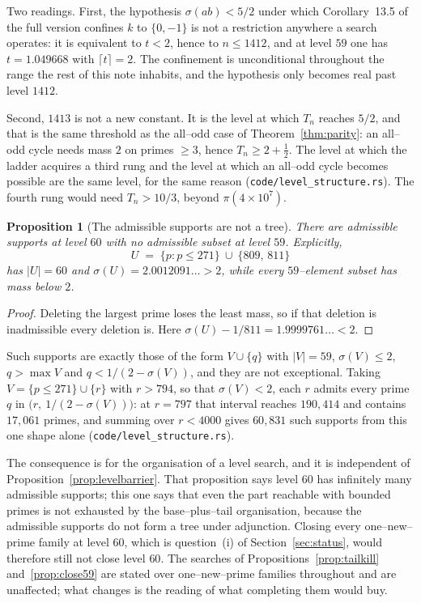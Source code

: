 \documentclass[11pt]{article}
\newtheorem{proposition}[theorem]{Proposition}
\theoremstyle{definition}
\begin{document}
Two readings. First, the hypothesis $\sigma(ab)<5/2$ under which
Corollary~13.5 of the full version confines $k$ to $\{0,-1\}$ is not a restriction anywhere a search
operates: it is equivalent to $t<2$, hence to $n\le1412$, and at level $59$ one has $t=1.049668$ with
$\lceil t\rceil=2$. The confinement is unconditional throughout the range the rest of this note
inhabits, and the hypothesis only becomes real past level $1412$.

Second, $1413$ is not a new constant. It is the level at which $T_n$ reaches $5/2$, and that is the
same threshold as the all--odd case of Theorem~\ref{thm:parity}: an all--odd cycle needs mass $2$ on
primes $\ge3$, hence $T_n\ge2+\tfrac12$. The level at which the ladder acquires a third rung and the
level at which an all--odd cycle becomes possible are the same level, for the same reason
\textup{(\texttt{code/level\_structure.rs})}. The fourth rung would need $T_n>10/3$, beyond
$\pi(4\times10^{7})$.

\begin{proposition}[The admissible supports are not a tree]\label{prop:nottree}
There are admissible supports at level $60$ with no admissible subset at level $59$. Explicitly,
\[ U\;=\;\{p:p\le271\}\ \cup\ \{809,\,811\} \]
has $|U|=60$ and $\sigma(U)=2.0012091\ldots>2$, while every $59$--element subset has mass below $2$.
\end{proposition}
\begin{proof}
Deleting the largest prime loses the least mass, so if that deletion is inadmissible every deletion
is. Here $\sigma(U)-1/811=1.9999761\ldots<2$.
\end{proof}

Such supports are exactly those of the form $V\cup\{q\}$ with $|V|=59$, $\sigma(V)\le2$,
$q>\max V$ and $q<1/(2-\sigma(V))$, and they are not exceptional. Taking $V=\{p\le271\}\cup\{r\}$
with $r>794$, so that $\sigma(V)<2$, each $r$ admits every prime $q$ in
$\bigl(r,\ 1/(2-\sigma(V))\bigr)$: at $r=797$ that interval reaches $190{,}414$ and contains
$17{,}061$ primes, and summing over $r<4000$ gives $60{,}831$ such supports from this one shape alone
\textup{(\texttt{code/level\_structure.rs})}.

The consequence is for the organisation of a level search, and it is independent of
Proposition~\ref{prop:levelbarrier}. That proposition says level $60$ has infinitely many admissible
supports; this one says that even the part reachable with bounded primes is not exhausted by the
base--plus--tail organisation, because the admissible supports do not form a tree under adjunction.
Closing every one--new--prime family at level $60$, which is question~(i) of
Section~\ref{sec:status}, would therefore still not close level $60$. The searches of
Propositions~\ref{prop:tailkill} and~\ref{prop:close59} are stated over one--new--prime families
throughout and are unaffected; what changes is the reading of what completing them would buy.
\end{document}
